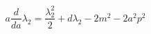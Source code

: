 \begin{equation}
a \frac d {da} \lambda_2= \frac {\lambda_2^2} 2+d \lambda_2 -2 m^2
-2 a^2 p^2 \label{flowequation}
\end{equation}

